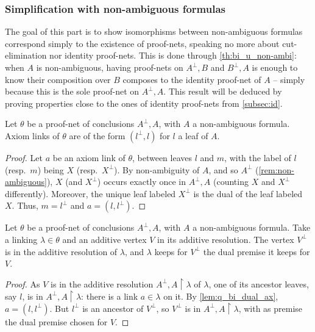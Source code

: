 \documentclass{lmcs}
\newcommand*{\orth}{^\perp} %
\newcommand*{\resp}{resp.}
\begin{document}
\subsubsection{Simplification with non-ambiguous formulas}
\label{subsec:red_non-amb}

The goal of this part is to show isomorphisms between non-ambiguous formulas correspond simply to the existence of proof-nets, speaking no more about cut-elimination nor identity proof-nets.
This is done through \autoref{th:bi_u_non-ambi}: when $A$ is non-ambiguous, having proof-nets on $A\orth, B$ and $B\orth, A$ is enough to know their composition over $B$ composes to the identity proof-net of $A$ -- simply because this is the sole proof-net on $A\orth, A$.
This result will be deduced by proving properties close to the ones of identity proof-nets from \autoref{subsec:id}.

\begin{lem}
\label{lem:q_bi_dual_ax}
Let $\theta$ be a proof-net of conclusions $A\orth,A$, with $A$ a non-ambiguous formula.
Axiom links of $\theta$ are of the form $(l\orth,l)$ for $l$ a leaf of $A$.
\end{lem}
\begin{proof}
Let $a$ be an axiom link of $\theta$, between leaves $l$ and $m$, with the label of $l$ (\resp\ $m$) being $X$ (\resp\ $X\orth$).
By non-ambiguity of $A$, and so $A\orth$ (\autoref{rem:non-ambiguous}), $X$ (and $X\orth$) occurs exactly once in $A\orth, A$ (counting $X$ and $X\orth$ differently).
Moreover, the unique leaf labeled $X\orth$ is the dual of the leaf labeled $X$.
Thus, $m = l\orth$ and $a = (l,l\orth)$.
\end{proof}

\begin{lem}
\label{lem:q_bi_dual_add}
Let $\theta$ be a proof-net of conclusions $A\orth,A$, with $A$ a non-ambiguous formula.
Take a linking $\lambda\in\theta$ and an additive vertex $V$ in its additive resolution.
The vertex $V\orth$ is in the additive resolution of $\lambda$, and $\lambda$ keeps for $V\orth$ the dual premise it keeps for $V$.
\end{lem}
\begin{proof}
As $V$ is in the additive resolution $A\orth,A\upharpoonright\lambda$ of $\lambda$, one of its ancestor leaves, say $l$, is in $A\orth,A\upharpoonright\lambda$: there is a link $a\in\lambda$ on it.
By \autoref{lem:q_bi_dual_ax}, $a=(l,l\orth)$.
But $l\orth$ is an ancestor of $V\orth$, so $V\orth$ is in $A\orth,A\upharpoonright\lambda$, with as premise the dual premise chosen for $V$.
\end{proof}
\end{document}
